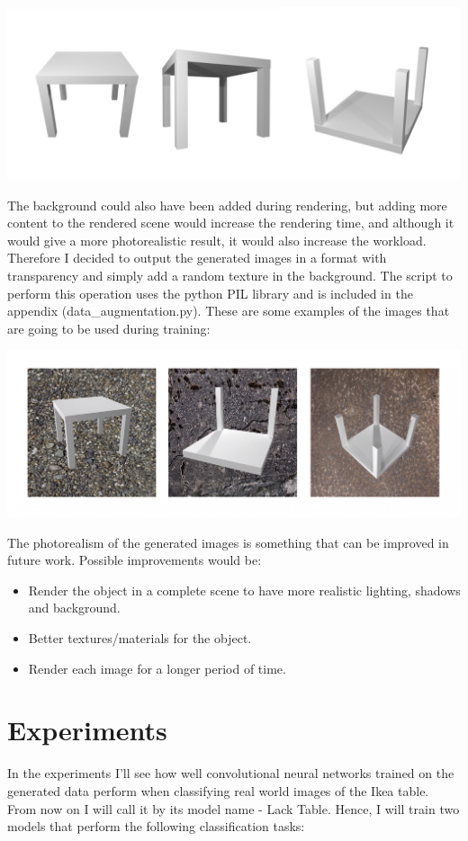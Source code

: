 \documentclass[10pt,a4paper]{article}
\begin{document}
\includegraphics[scale=0.45]{table_1}

The background could also have been added during rendering, but adding more content to the rendered scene would increase the rendering time, and although it would give a more photorealistic result, it would also increase the workload. Therefore I decided to output the generated images in a format with transparency and simply add a random texture in the background. The script to perform this operation uses the python PIL library and is included in the appendix (data\_augmentation.py). These are some examples of the images that are going to be used during training:

\includegraphics[scale=0.45]{table_2}

The photorealism of the generated images is something that can be improved in future work. Possible improvements would be:
\begin{itemize}
\item Render the object in a complete scene to have more realistic lighting, shadows and background.
\item Better textures/materials for the object.
\item Render each image for a longer period of time.
\end{itemize}

\section{Experiments}
In the experiments I'll see how well convolutional neural networks trained on the generated data perform when classifying real world images of the Ikea table. From now on I will call it by its model name - Lack Table. Hence, I will train two models that perform the following classification tasks:
\end{document}
